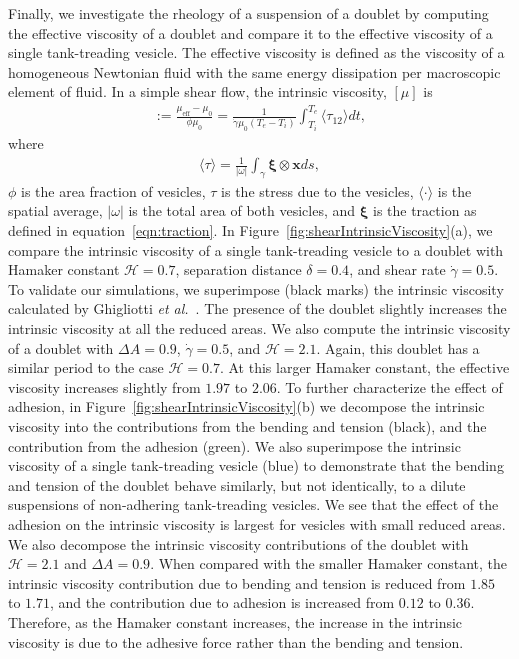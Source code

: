 \documentclass[prf,superscriptaddress,showkeys,longbibliography]{revtex4-1}
\newcommand{\xx}{\mathbf{x}}
\newcommand{\xxi}{\boldsymbol{\xi}}
\begin{document}
Finally, we investigate the rheology of a suspension of a doublet by
computing the effective viscosity of a doublet and compare it to the
effective viscosity of a single tank-treading vesicle. The effective
viscosity is defined as the viscosity of a homogeneous Newtonian fluid
with the same energy dissipation per macroscopic element of fluid.  In a
simple shear flow, the intrinsic viscosity, $[\mu]$ is
\begin{align*}
  [\mu]:= \frac{\mu_{\mathrm{eff}} - \mu_0}{\phi \mu_0} = 
  \frac{1}{\dot\gamma \mu_0 (T_e - T_i)} \int_{T_i}^{T_e} 
  \langle \tau_{12} \rangle dt,
\end{align*}
where
\begin{align*}
  \langle \tau \rangle = \frac{1}{|\omega|} \int_{\gamma}
    \xxi \otimes \xx ds,
\end{align*}
$\phi$ is the area fraction of vesicles, $\tau$ is the stress due to the
vesicles, $\langle \cdot \rangle$ is the spatial average, $|\omega|$ is
the total area of both vesicles, and $\xxi$ is the traction as defined
in equation~\eqref{eqn:traction}.  In
Figure~\ref{fig:shearIntrinsicViscosity}(a), we compare the intrinsic
viscosity of a single tank-treading vesicle to a doublet with Hamaker
constant $\mathcal{H} = 0.7$, separation distance $\delta = 0.4$, and
shear rate $\dot\gamma = 0.5$.  To validate our simulations, we
superimpose (black marks) the intrinsic viscosity calculated by
Ghigliotti {\em et al.}~\cite{GhigliottiBibenMisbah2010_JFM}.  The
presence of the doublet slightly increases the intrinsic viscosity at
all the reduced areas.  We also compute the intrinsic viscosity of a
doublet with $\Delta A = 0.9$, $\dot\gamma = 0.5$, and $\mathcal{H} =
2.1$.  Again, this doublet has a similar period to the case $\mathcal{H}
= 0.7$. At this larger Hamaker constant, the effective viscosity
increases slightly from $1.97$ to $2.06$.  To further characterize the
effect of adhesion, in Figure~\ref{fig:shearIntrinsicViscosity}(b) we
decompose the intrinsic viscosity into the contributions from the
bending and tension (black), and the contribution from the adhesion
(green).  We also superimpose the intrinsic viscosity of a single
tank-treading vesicle (blue) to demonstrate that the bending and tension
of the doublet behave similarly, but not identically, to a dilute
suspensions of non-adhering tank-treading vesicles.  We see that the
effect of the adhesion on the intrinsic viscosity is largest for
vesicles with small reduced areas.  We also decompose the intrinsic
viscosity contributions of the doublet with $\mathcal{H} = 2.1$ and
$\Delta A = 0.9$.  When compared with the smaller Hamaker constant, the
intrinsic viscosity contribution due to bending and tension is reduced
from $1.85$ to $1.71$, and the contribution due to adhesion is increased
from $0.12$ to $0.36$.  Therefore, as the Hamaker constant increases,
the increase in the intrinsic viscosity is due to the adhesive force
rather than the bending and tension.
\end{document}
